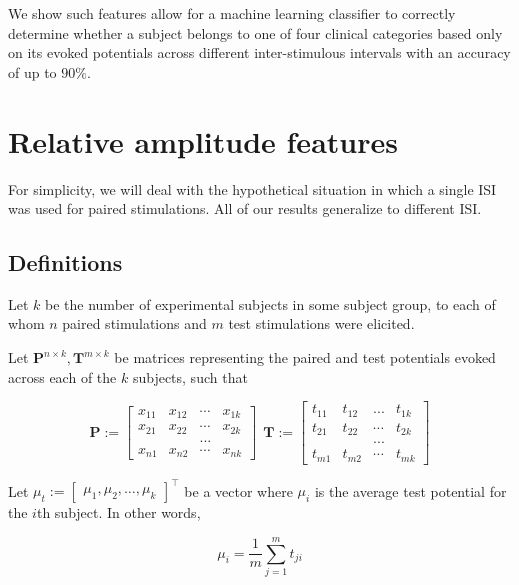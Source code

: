 \documentclass{article}
\begin{document}
We show such features allow for a machine learning classifier to correctly determine whether a subject belongs to one of four clinical categories based only on its evoked potentials across different inter-stimulous intervals with an accuracy of up to $90\%$.

\section{Relative amplitude features}

For simplicity, we will deal with the hypothetical situation in which a single ISI was used for paired stimulations. All of our results generalize to different ISI.

\subsection{Definitions}

Let $k$ be the number of experimental subjects in some subject group, to each of whom $n$ paired stimulations and $m$ test stimulations were elicited.

\begin{definition}

    Let $\textbf{P}^{n \times k}, \textbf{T}^{m\times k}$ be matrices representing the paired and test potentials evoked across each of the $k$ subjects, such that  

    \begin{equation}
    \textbf{P} := \begin{bmatrix}x_{11} & x_{12}& \cdots & x_{1k} \\
    x_{21} & x_{22}& \cdots & x_{2k} \\
    & & ... & \\
    x_{n1} & x_{n2}& \cdots & x_{nk} 
    \end{bmatrix} ~~
    \textbf{T}:= \begin{bmatrix}t_{11} & t_{12}& ... & t_{1k} \\
    t_{21} & t_{22}& \cdots & t_{2k} \\
    & & ... & \\
    t_{m1} & t_{m2}& \cdots & t_{mk} 
    \end{bmatrix}
    \end{equation}
\end{definition}

\begin{definition}
Let $\mu_t := \begin{bmatrix} \mu_1, \mu_2, \ldots, \mu_k \end{bmatrix}^\top$ be a vector where $\mu_i$ is the average test potential for the $i$th subject. In other words,

\begin{equation}
    \mu_i = \frac{1}{m}\sum_{j=1}^m t_{ji}
\end{equation}
\end{definition}
\end{document}
